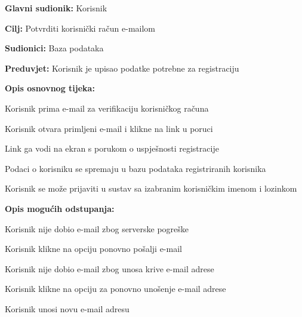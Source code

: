 					\noindent {}
					\begin{packed_item}
						
						\item \textbf{Glavni sudionik: }Korisnik
						\item  \textbf{Cilj:} Potvrditi korisnički račun e-mailom
						\item  \textbf{Sudionici:} Baza podataka
						\item  \textbf{Preduvjet:} Korisnik je upisao podatke potrebne za registraciju
						\item  \textbf{Opis osnovnog tijeka:}
						
						\item[] \begin{packed_enum}
							
							\item Korisnik prima e-mail za verifikaciju korisničkog računa
							\item Korisnik otvara primljeni e-mail i klikne na link u poruci
							\item Link ga vodi na ekran s porukom o uspješnosti registracije
							\item Podaci o korisniku se spremaju u bazu podataka registriranih korisnika
							\item Korisnik se može prijaviti u sustav sa izabranim korisničkim imenom i lozinkom
						\end{packed_enum}
						
						\item  \textbf{Opis mogućih odstupanja:}
						
						\item[] \begin{packed_item}
							
							\item[1.a] Korisnik nije dobio e-mail zbog serverske pogreške
							\item[] \begin{packed_enum}
								
								\item Korisnik klikne na opciju ponovno pošalji e-mail
								
							\end{packed_enum}
							\item[1.b] Korisnik nije dobio e-mail zbog unosa krive e-mail adrese
								\item[] \begin{packed_enum}
								
								\item Korisnik klikne na opciju za ponovno unošenje e-mail adrese
								\item Korisnik unosi novu e-mail adresu
								
							\end{packed_enum}
							
						\end{packed_item}
					\end{packed_item}
					
